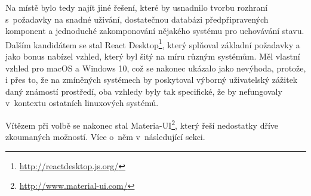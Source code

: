 Na místě bylo tedy najít jiné řešení, které by usnadnilo tvorbu rozhraní s~požadavky na snadné uživání, dostatečnou databázi předpřipravených komponent a jednoduché zakomponování nějakého systému pro uchovávání stavu. Dalším kandidátem se stal React Desktop\footnote{\url{http://reactdesktop.js.org/}}, který splňoval základní požadavky a jako bonus nabízel vzhled, který byl šitý na míru různým systémům. Měl vlastní vzhled pro macOS a Windows 10, což se nakonec ukázalo jako nevýhoda, protože, i přes to, že na zmíněných systémech by poskytoval výborný uživatelský zážitek daný známostí prostředí, oba vzhledy byly tak specifické, že by nefungovaly v~kontextu ostatních linuxových systémů.

Vítězem při volbě se nakonec stal Materia-UI\footnote{\url{http://www.material-ui.com/}}, který řeší nedostatky dříve zkoumaných možností. Více o~něm v~následující sekci.





